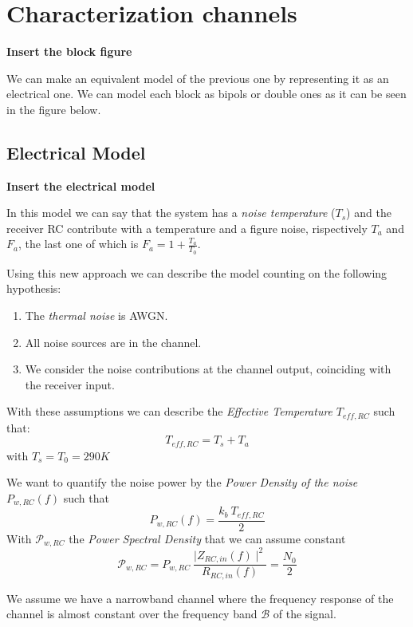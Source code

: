\section{Characterization channels}

\textbf{Insert the block figure}

We can make an equivalent model of the previous one by representing it as an electrical one.
We can model each block as bipols or double ones as it can be seen in the figure below.


\subsection{Electrical Model}
\textbf{Insert the electrical model}

In this model we can say that the system has a \textit{noise temperature} ($T_s$) and the receiver RC contribute with a temperature and a figure noise, rispectively $T_a$ and $F_a$, the last one of which is $F_a = 1 + \frac{T_a}{T_0}$.

Using this new approach we can describe the model counting on the following hypothesis:
\begin{enumerate}
\item The \textit{thermal noise} is AWGN.
\item All noise sources are in the channel.
\item We consider the noise contributions at the channel output, coinciding with the receiver input.
\end{enumerate}

With these assumptions we can describe the \textit{Effective Temperature} $T_{eff,RC}$ such that:
\begin{equation}
T_{eff,RC} = T_s + T_a
\end{equation}
with $T_s = T_0 = 290K$

We want to quantify the noise power by the \textit{Power Density of the noise} $P_{w,RC}(f)$ such that
$$P_{w,RC} (f) = \frac{k_b \ T_{eff,RC}}{2}$$
With $\mathcal{P}_{w,RC}$ the \textit{Power Spectral Density} that we can assume constant
\begin{equation}
\mathcal{P}_{w,RC} = P_{w,RC}\ \frac{\mid Z_{RC,in}(f)\mid ^2}{R_{RC,in}(f)} = \frac{N_0}{2}
\end{equation}

We assume we have a narrowband channel where the frequency response of the channel is almost constant over the frequency band $\mathcal{B}$ of the signal.

